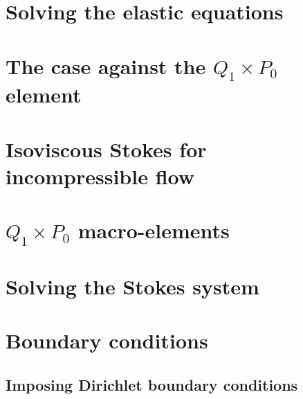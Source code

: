 \newpage %
\section{Solving the elastic equations}  %

\newpage %
\section{The case against the $Q_1\times P_0$ element}  %

\newpage %
\section{Isoviscous Stokes for incompressible flow}\label{ss:isovisc}  %

\newpage %
\section{$Q_1\times P_0$ macro-elements} \label{ss:meshtopos}  %

\newpage %
\section{Solving the Stokes system \label{sec:solvers}}  %

\newpage %
\section{Boundary conditions}
\subsection{Imposing Dirichlet boundary conditions \label{ss:howtobc}}  %
\newpage %
